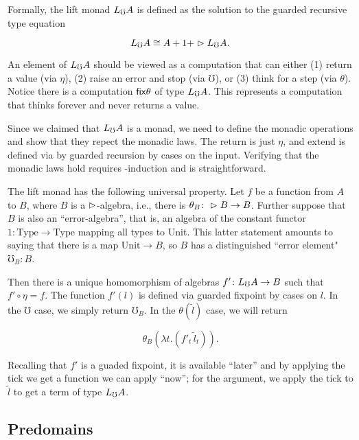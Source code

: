 Formally, the lift monad $L_\mho A$ is defined as the solution to the guarded recursive type equation

\[ L_\mho A \cong A + 1 + \vartriangleright L_\mho A. \]

An element of $L_\mho A$ should be viewed as a computation that can either (1) return a value (via $\eta$),
(2) raise an error and stop (via $\mho$), or (3) think for a step (via $\theta$).
%
Notice there is a computation $\mathsf{fix} \theta$ of type $L_\mho A$. This represents a computation
that thinks forever and never returns a value.

Since we claimed that $L_\mho A$ is a monad, we need to define the monadic operations
and show that they repect the monadic laws. The return is just $\eta$, and extend
is defined via by guarded recursion by cases on the input.
%
%
Verifying that the monadic laws hold requires \lob-induction and is straightforward.

The lift monad has the following universal property. Let $f$ be a function from $A$ to $B$,
where $B$ is a $\vartriangleright$-algebra, i.e., there is $\theta_B \colon \vartriangleright B \to B$.
Further suppose that $B$ is also an ``error-algebra'', that is, an algebra of the
constant functor $1 \colon \text{Type} \to \text{Type}$ mapping all types to Unit.
This latter statement amounts to saying that there is a map $\text{Unit} \to B$, so $B$ has a
distinguished ``error element" $\mho_B \colon B$.

Then there is a unique homomorphism of algebras $f' \colon L_\mho A \to B$ such that
$f' \circ \eta = f$. The function $f'(l)$ is defined via guarded fixpoint by cases on $l$. 
In the $\mho$ case, we simply return $\mho_B$.
In the $\theta(\tilde{l})$ case, we will return

\[\theta_B (\lambda t . (f'_t \, \tilde{l}_t)). \]

Recalling that $f'$ is a guaded fixpoint, it is available ``later'' and by
applying the tick we get a function we can apply ``now''; for the argument,
we apply the tick to $\tilde{l}$ to get a term of type $L_\mho A$.




\subsection{Predomains}

